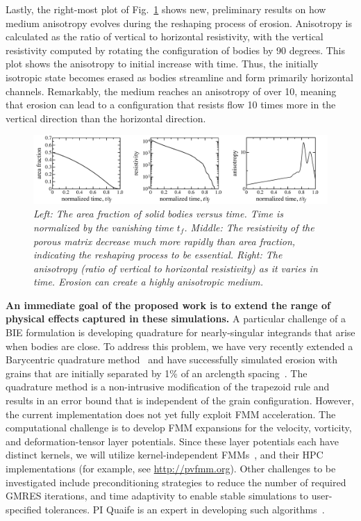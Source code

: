 \documentclass[11pt]{article}
\begin{document}
Lastly, the right-most plot of Fig.~\ref{fig3} shows new, preliminary results on how medium anisotropy evolves during the reshaping process of erosion. Anisotropy is calculated as the ratio of vertical to horizontal resistivity, with the vertical resistivity computed by rotating the configuration of bodies by 90 degrees. This plot shows the anisotropy to initial increase with time. Thus, the initially isotropic state becomes erased as bodies streamline and form primarily horizontal channels. Remarkably, the medium reaches an anisotropy of over 10, meaning that erosion can lead to a configuration that resists flow 10 times more in the vertical direction than the horizontal direction.

\begin{figure}%
\begin{center}
\includegraphics[width = 0.99 \textwidth]{./figs/fig3.pdf}
  \caption{\label{fig3} \em Left: The area fraction of solid bodies versus time. Time is normalized by the vanishing time $t_f$.  Middle: The resistivity of the porous matrix decrease much more rapidly than area fraction, indicating the reshaping process to be essential. Right: The anisotropy (ratio of vertical to horizontal resistivity) as it varies in time. Erosion can create a highly anisotropic medium.} \end{center}
\end{figure}

{\bf An immediate goal of the proposed work is to extend the range of physical effects captured in these simulations.} A particular challenge of a BIE formulation is developing quadrature for nearly-singular integrands that arise when bodies are close. To address this problem, we have very recently extended a Barycentric quadrature method~\cite{bar2014, bar-wu-vee2015} and have successfully simulated erosion with grains that are initially separated by 1\% of an arclength spacing~\cite{chi-moo-qua2019}. The quadrature method is a non-intrusive modification of the trapezoid rule and results in an error bound that is independent of the grain configuration. However, the current implementation does not yet fully exploit FMM acceleration. The computational challenge is to develop FMM expansions for the velocity, vorticity, and deformation-tensor layer potentials. Since these layer potentials each have distinct kernels, we will utilize kernel-independent FMMs~\cite{yin-bir-zor2004, fon-dar2009}, and their HPC implementations (for example, see \url{http://pvfmm.org}). Other challenges to be investigated include preconditioning strategies to reduce the number of required GMRES iterations, and time adaptivity to enable stable simulations to user-specified tolerances. PI Quaife is an expert in developing such algorithms~\cite{qua-bir2015b, qua-bir2016, qua-bir2015a, qua-cou-dar2018}.
\end{document}
